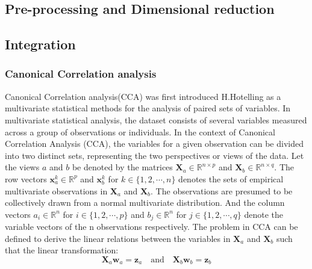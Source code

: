 \subsection{Pre-processing and Dimensional reduction}
\subsection{Integration}

\subsubsection{Canonical Correlation analysis}
Canonical Correlation analysis(CCA) was first introduced H.Hotelling\citep{hotelling1935cca1,HOTELLING1936cca2} as a multivariate statistical methods for the analysis of paired sets of variables. In multivariate statistical analysis, the dataset consists of several variables measured across a group of observations or individuals. In the context of Canonical Correlation Analysis (CCA), the variables for a given observation can be divided into two distinct sets, representing the two perspectives or views of the data. Let the views $a$ and $b$ be denoted by the matrices $\mathbf{X}_a\in\mathbb{R}^{n\times p}$ and $\mathbf{X}_b\in \mathbb{R}^{n\times q}$. The row vectors $\mathbf{x}_a^k\in \mathbb{R}^{p}$ and $\mathbf{x}_b^k$ for $k\in\{1,2,\cdots, n\}$ denotes the sets of empirical multivariate observations in $\mathbf{X}_a$ and $\mathbf{X}_b$. The observations are presumed to be collectively drawn from a normal multivariate distribution. And the column vectors $a_i\in \mathbb{R}^n$ for $i\in \{1,2,\cdots, p\}$ and $b_j\in \mathbb{R}^n$ for ${j\in \{1,2,\cdots, q\}}$ denote the variable vectors of the n observations respectively. The problem in CCA can be defined to derive the linear relations between the variables in $\mathbf{X}_a$ and $\mathbf{X}_b$ such that the linear transformation:
\begin{equation}
\mathbf{X}_a\mathbf{w}_a=\mathbf{z}_a\quad\text{and}\quad \mathbf{X}_b\mathbf{w}_b=\mathbf{ z}_b
\end{equation}

